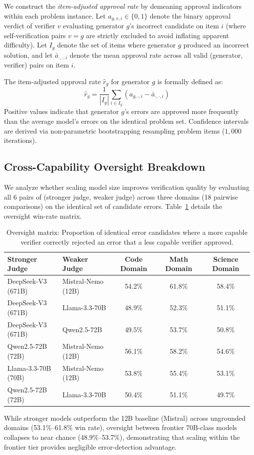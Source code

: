 We construct the \emph{item-adjusted approval rate} by demeaning approval indicators within each problem instance. Let $a_{g, v, i} \in \{0, 1\}$ denote the binary approval verdict of verifier $v$ evaluating generator $g$'s incorrect candidate on item $i$ (where self-verification pairs $v = g$ are strictly excluded to avoid inflating apparent difficulty). Let $I_g$ denote the set of items where generator $g$ produced an incorrect solution, and let $\bar{a}_{\cdot, \cdot, i}$ denote the mean approval rate across all valid (generator, verifier) pairs on item $i$.

The item-adjusted approval rate $\hat{r}_g$ for generator $g$ is formally defined as:
\begin{equation}
\hat{r}_g = \frac{1}{|I_g|} \sum_{i \in I_g} \left( a_{g, \cdot, i} - \bar{a}_{\cdot, \cdot, i} \right)
\end{equation}
Positive values indicate that generator $g$'s errors are approved more frequently than the average model's errors on the identical problem set. Confidence intervals are derived via non-parametric bootstrapping resampling problem items ($1{,}000$ iterations).

\subsection{Cross-Capability Oversight Breakdown}
We analyze whether scaling model size improves verification quality by evaluating all 6 pairs of (stronger judge, weaker judge) across three domains (18 pairwise comparisons) on the identical set of candidate errors. Table~\ref{tab:oversight-full} details the oversight win-rate matrix.

\begin{table}[H]
\centering
\small
\caption{Oversight matrix: Proportion of identical error candidates where a more capable verifier correctly rejected an error that a less capable verifier approved.}
\label{tab:oversight-full}
\begin{tabular}{llccc}
\toprule
\bf Stronger Judge & \bf Weaker Judge & \bf Code Domain & \bf Math Domain & \bf Science Domain \\
\midrule
DeepSeek-V3 (671B) & Mistral-Nemo (12B) & 54.2\% & 61.8\% & 58.4\% \\
DeepSeek-V3 (671B) & Llama-3.3-70B      & 48.9\% & 52.3\% & 51.1\% \\
DeepSeek-V3 (671B) & Qwen2.5-72B        & 49.5\% & 53.7\% & 50.8\% \\
Qwen2.5-72B (72B)  & Mistral-Nemo (12B) & 56.1\% & 58.2\% & 54.6\% \\
Llama-3.3-70B (70B)& Mistral-Nemo (12B) & 53.8\% & 55.4\% & 53.1\% \\
Qwen2.5-72B (72B)  & Llama-3.3-70B      & 50.4\% & 51.1\% & 49.7\% \\
\bottomrule
\end{tabular}
\end{table}
While stronger models outperform the 12B baseline (Mistral) across ungrounded domains (53.1\%--61.8\% win rate), oversight between frontier 70B-class models collapses to near chance (48.9\%--53.7\%), demonstrating that scaling within the frontier tier provides negligible error-detection advantage.

